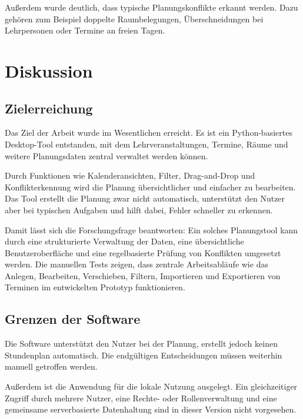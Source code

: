 \documentclass[12pt,a4paper]{article}
\begin{document}
Außerdem wurde deutlich, dass typische Planungskonflikte erkannt werden. Dazu gehören zum Beispiel doppelte Raumbelegungen, Überschneidungen bei Lehrpersonen oder Termine an freien Tagen.

\clearpage

\section{Diskussion}

\subsection{Zielerreichung}

Das Ziel der Arbeit wurde im Wesentlichen erreicht. Es ist ein Python-basiertes Desktop-Tool entstanden, mit dem Lehrveranstaltungen, Termine, Räume und weitere Planungsdaten zentral verwaltet werden können.

Durch Funktionen wie Kalenderansichten, Filter, Drag-and-Drop und Konflikterkennung wird die Planung übersichtlicher und einfacher zu bearbeiten. Das Tool erstellt die Planung zwar nicht automatisch, unterstützt den Nutzer aber bei typischen Aufgaben und hilft dabei, Fehler schneller zu erkennen.

Damit lässt sich die Forschungsfrage beantworten: Ein solches Planungstool kann durch eine strukturierte Verwaltung der Daten, eine übersichtliche Benutzeroberfläche und eine regelbasierte Prüfung von Konflikten umgesetzt werden. Die manuellen Tests zeigen, dass zentrale Arbeitsabläufe wie das Anlegen, Bearbeiten, Verschieben, Filtern, Importieren und Exportieren von Terminen im entwickelten Prototyp funktionieren.

\subsection{Grenzen der Software}

Die Software unterstützt den Nutzer bei der Planung, erstellt jedoch keinen Stundenplan automatisch. Die endgültigen Entscheidungen müssen weiterhin manuell getroffen werden.

Außerdem ist die Anwendung für die lokale Nutzung ausgelegt. Ein gleichzeitiger Zugriff durch mehrere Nutzer, eine Rechte- oder Rollenverwaltung und eine gemeinsame serverbasierte Datenhaltung sind in dieser Version nicht vorgesehen.
\end{document}
